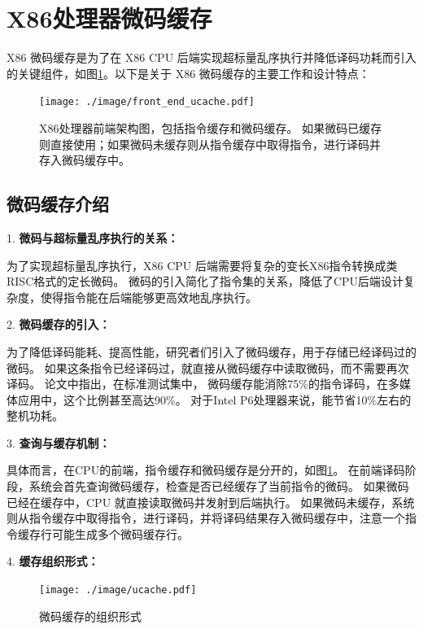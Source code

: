 \section{X86处理器微码缓存}\label{sec:complex_isa}

X86 微码缓存是为了在 X86 CPU 后端实现超标量乱序执行并降低译码功耗而引入的关键组件\cite{solomonMicrooperationCachePower2001}，如图\ref{img:front_end_ucache}。以下是关于 X86 微码缓存的主要工作和设计特点：

\begin{figure}[!htbp]
  \centering
  \texttt{[image: ./image/front\_end\_ucache.pdf]}
  \caption{X86处理器前端架构图，包括指令缓存和微码缓存。
  如果微码已缓存则直接使用；如果微码未缓存则从指令缓存中取得指令，进行译码并存入微码缓存中。}
  \label{img:front_end_ucache}
\end{figure}

\subsection{微码缓存介绍}

1. \textbf{微码与超标量乱序执行的关系：}

为了实现超标量乱序执行，X86 CPU 后端需要将复杂的变长X86指令转换成类RISC格式的定长微码。
微码的引入简化了指令集的关系，降低了CPU后端设计复杂度，使得指令能在后端能够更高效地乱序执行。

2. \textbf{微码缓存的引入：}

为了降低译码能耗、提高性能，研究者们引入了微码缓存，用于存储已经译码过的微码。
如果这条指令已经译码过，就直接从微码缓存中读取微码，而不需要再次译码。
\cite{solomonMicrooperationCachePower2001}论文中指出，在标准测试集中，
微码缓存能消除75\%的指令译码，在多媒体应用中，这个比例甚至高达90\%。
对于Intel P6处理器来说，能节省10\%左右的整机功耗。

3. \textbf{查询与缓存机制：}

具体而言，在CPU的前端，指令缓存和微码缓存是分开的，如图\ref{img:front_end_ucache}。
在前端译码阶段，系统会首先查询微码缓存，检查是否已经缓存了当前指令的微码。
如果微码已经在缓存中，CPU 就直接读取微码并发射到后端执行。
如果微码未缓存，系统则从指令缓存中取得指令，进行译码，并将译码结果存入微码缓存中，注意一个指令缓存行可能生成多个微码缓存行。

4. \textbf{缓存组织形式：}

\begin{figure}[!htbp]
  \centering
  \texttt{[image: ./image/ucache.pdf]}
  \caption{微码缓存的组织形式}
  \label{img:ucache}
\end{figure}

